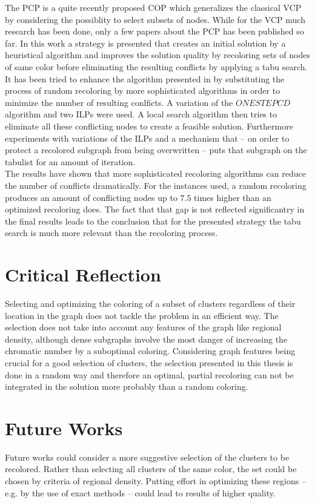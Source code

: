 
The PCP is a quite recently proposed COP which generalizes the classical VCP by considering the possiblity to select subsets of nodes. While for the VCP much research has been done, only a few papers about the PCP has been published so far. In this work a strategy is presented that creates an initial solution by a heuristical algorithm and improves the solution quality by recoloring sets of nodes of same color before eliminating the resulting conflicts by applying a tabu search. It has been tried to enhance the algorithm presented in \cite{noronha-06} by substituting the process of random recoloring by more sophisticated algorithms in order to minimize the number of resulting conlficts. A variation of the $ONESTEPCD$ algorithm \cite{li-00} and two ILPs were used. A local search algorithm then tries to eliminate all these conflicting nodes to create a feasible solution. Furthermore experiments with variations of the ILPs and a mechanism that -- on order to protect a recolored subgraph from being overwritten -- puts that subgraph on the tabulist for an amount of iteration.\\
The results have shown that more sophisticated recoloring algorithms can reduce the number of conflicts dramatically. For the instances used, a random recoloring produces an amount of conflicting nodes up to $7.5$ times higher than an optimized recoloring does. The fact that that gap is not reflected significantry in the final results leads to the conclusion that for the presented strategy the tabu search is much more relevant than the recoloring process.

\section{Critical Reflection}
Selecting and optimizing the coloring of a subset of clusters regardless of their location in the graph does not tackle the problem in an efficient way. The selection does not take into account any features of the graph like regional density, although dense subgraphs involve the most danger of increasing the chromatic number by a suboptimal coloring. Considering graph features being crucial for a good selection of clusters, the selection presented in this thesis is done in a random way and therefore an optimal, partial recoloring can not be integrated in the solution more probably than a random coloring.  

\section{Future Works}
Future works could consider a more suggestive selection of the clusters to be recolored. Rather than selecting all clusters of the same color, the set could be chosen by criteria of regional density. Putting effort in optimizing these regions -- e.g. by the use of exact methods -- could lead to results of higher quality. 


